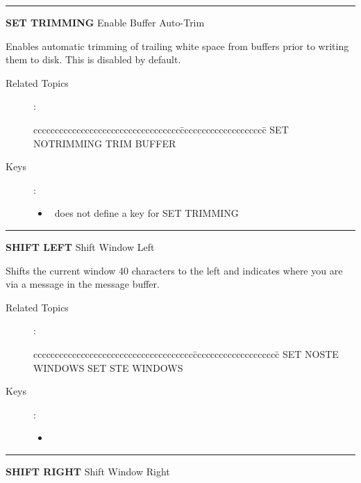 \goodbreak

\rule{\textwidth}{0.3mm}

{\Large {\bf SET TRIMMING} \hfill Enable Buffer Auto-Trim}

\medskip
  Enables automatic trimming of trailing white space from buffers
  prior to writing them to disk. This is disabled by default.

\begin{description}
\item[Related Topics]:
\begin{tabbing}
cccccccccccccccccccccccccccccccccc\=cccccccccccccccccccc\=\kill
    SET NOTRIMMING \>   TRIM BUFFER \\
\end{tabbing}

\item[Keys]:
          \begin{itemize}
          \item \STEve\ does not define a key for SET TRIMMING
          \end{itemize}
\end{description}

\goodbreak

\rule{\textwidth}{0.3mm}

{\Large {\bf SHIFT LEFT} \hfill Shift Window Left}

\medskip
  Shifts the current window 40 characters to the left and indicates
  where you are via a message in the message buffer.

\begin{description}
\item[Related Topics]:
\begin{tabbing}
ccccccccccccccccccccccccccccccccccccc\=cccccccccccccccccccc\=\kill
    SET NOSTE WINDOWS \>   SET STE WINDOWS\\
\end{tabbing}

\item[Keys]:
     \begin{itemize}
     \item \gold\ \keyname{$\lhd$}
     \end{itemize}

\end{description}

\goodbreak

\rule{\textwidth}{0.3mm}

{\Large {\bf SHIFT RIGHT} \hfill Shift Window Right}

